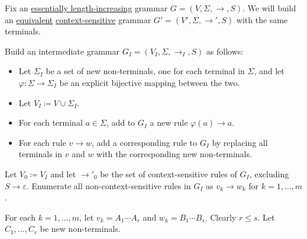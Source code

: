 \begin{algorithm}\label{alg:length_increasing_to_context_sensitive}
  Fix an \hyperref[def:length_increasing_grammar]{essentially length-increasing} grammar \( G = (V, \Sigma, \to, S) \). We will build an \hyperref[def:formal_grammar/equivalent]{equivalent} \hyperref[def:chomsky_hierarchy/context_sensitive]{context-sensitive} grammar \( G' = (V', \Sigma, \to', S) \) with the same terminals.

  \begin{thmenum}
     Build an intermediate grammar \( G_I = (V_I, \Sigma, \to_I, S) \) as follows:
    \begin{itemize}
      \item Let \( \Sigma_I \) be a set of new non-terminals, one for each terminal in \( \Sigma \), and let \( \varphi: \Sigma \to \Sigma_I \) be an explicit bijective mapping between the two.
      \item Let \( V_I \coloneqq V \cup \Sigma_I \).
      \item For each terminal \( a \in \Sigma \), add to \( G_I \) a new rule \( \varphi(a) \to a \).
      \item For each rule \( v \to w \), add a corresponding rule to \( G_I \) by replacing all terminals in \( v \) and \( w \) with the corresponding new non-terminals.
    \end{itemize}

     Let \( V_0 \coloneqq V_I \) and let \( \to'_0 \) be the set of context-sensitive rules of \( G_I \), excluding \( S \to \varepsilon \). Enumerate all non-context-sensitive rules in \( G_I \) as \( v_k \to w_k \) for \( k = 1, \ldots, m \).

     For each \( k = 1, \ldots, m \), let \( v_k = A_1 \cdots A_r \) and \( w_k = B_1 \cdots B_s \). Clearly \( r \leq s \). Let \( C_1, \ldots, C_r \) be new non-terminals.


\end{thmenum}
\end{algorithm}
